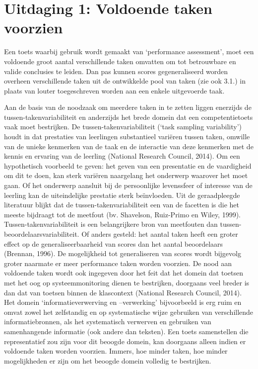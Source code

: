 \documentclass[
  letterpaper,
]{report}
\begin{document}
\hypertarget{uitdaging-1-voldoende-taken-voorzien}{%
\section{Uitdaging 1: Voldoende taken
voorzien}\label{uitdaging-1-voldoende-taken-voorzien}}

Een toets waarbij gebruik wordt gemaakt van `performance assessment',
moet een voldoende groot aantal verschillende taken omvatten om tot
betrouwbare en valide conclusies te leiden. Dan pas kunnen scores
gegeneraliseerd worden overheen verschillende taken uit de ontwikkelde
pool van taken (zie ook 3.1.) in plaats van louter toegeschreven worden
aan een enkele uitgevoerde taak.

Aan de basis van de noodzaak om meerdere taken in te zetten liggen
enerzijds de tussen-takenvariabiliteit en anderzijds het brede domein
dat een competentietoets vaak moet bestrijken. De
tussen-takenvariabiliteit (`task sampling variability') houdt in dat
prestaties van leerlingen substantieel variëren tussen taken, omwille
van de unieke kenmerken van de taak en de interactie van deze kenmerken
met de kennis en ervaring van de leerling (National Research Council,
2014). Om een hypothetisch voorbeeld te geven: het geven van een
presentatie en de vaardigheid om dit te doen, kan sterk variëren
naargelang het onderwerp waarover het moet gaan. Of het onderwerp
aansluit bij de persoonlijke levenssfeer of interesse van de leerling
kan de uiteindelijke prestatie sterk beïnvloeden. Uit de geraadpleegde
literatuur blijkt dat de tussen-takenvariabiliteit een van de facetten
is die het meeste bijdraagt tot de meetfout (bv. Shavelson, Ruiz-Primo
en Wiley, 1999). Tussen-takenvariabiliteit is een belangrijkere bron van
meetfouten dan tussen-beoordelaarsvariabiliteit. Of anders gesteld: het
aantal taken heeft een groter effect op de generaliseerbaarheid van
scores dan het aantal beoordelaars (Brennan, 1996). De mogelijkheid tot
generaliseren van scores wordt bijgevolg groter naarmate er meer
performance taken worden voorzien. De nood aan voldoende taken wordt ook
ingegeven door het feit dat het domein dat toetsen met het oog op
systeemmonitoring dienen te bestrijken, doorgaans veel breder is dan dat
van toetsen binnen de klascontext (National Research Council, 2014). Het
domein `informatieverwerving en --verwerking' bijvoorbeeld is erg ruim
en omvat zowel het zelfstandig en op systematische wijze gebruiken van
verschillende informatiebronnen, als het systematisch verwerven en
gebruiken van samenhangende informatie (ook andere dan teksten). Een
toets samenstellen die representatief zou zijn voor dit beoogde domein,
kan doorgaans alleen indien er voldoende taken worden voorzien. Immers,
hoe minder taken, hoe minder mogelijkheden er zijn om het beoogde domein
volledig te bestrijken.
\end{document}
